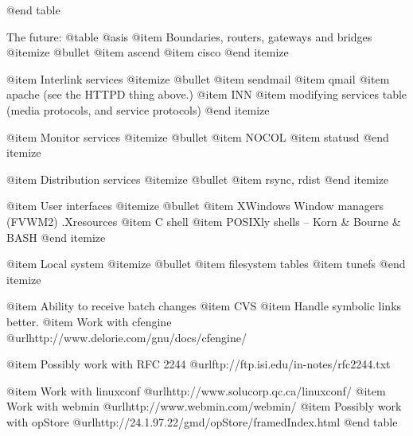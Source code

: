 @end table

The future:
@table @asis 
@item Boundaries, routers, gateways and bridges
@itemize @bullet
@item ascend
@item cisco
@end itemize

@item Interlink services
@itemize @bullet
@item sendmail
@item qmail
@item apache
(see the HTTPD thing above.)
@item INN
@item modifying services table (media protocols, and service protocols)
@end itemize

@item Monitor services
@itemize @bullet
@item NOCOL
@item statusd
@end itemize

@item Distribution services
@itemize @bullet
@item rsync, rdist
@end itemize

@item User interfaces
@itemize @bullet
@item XWindows
 Window managers (FVWM2)
 .Xresources
@item C shell
@item POSIXly shells --  Korn & Bourne & BASH
@end itemize

@item Local system
@itemize @bullet
@item filesystem tables
@item tunefs
@end itemize

@item Ability to receive batch changes
@item CVS
@item Handle symbolic links better.
@item Work with cfengine
@url{http://www.delorie.com/gnu/docs/cfengine/}

@item Possibly work with RFC 2244
@url{ftp://ftp.isi.edu/in-notes/rfc2244.txt}

@item Work with linuxconf
@url{http://www.solucorp.qc.ca/linuxconf/}
@item Work with webmin
@url{http://www.webmin.com/webmin/}
@item Possibly work with opStore
@url{http://24.1.97.22/gmd/opStore/framedIndex.html}
@end table

